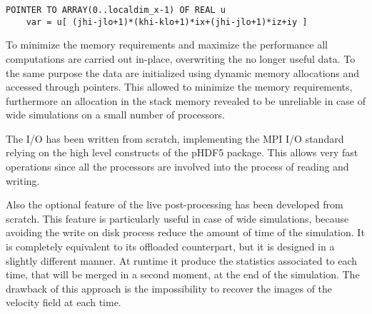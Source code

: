 \begin{lstlisting}[caption={Example of variable declaration and access to a particular value of the array. The 3D pencil is flattened to a 1D vector with $y$ as fast-varying index, $z$ as mid-varying index and $x$ as slow-varying index. This is mandatory to work with MPI},captionpos=b]
	POINTER TO ARRAY(0..localdim_x-1) OF REAL u
	var = u[ (jhi-jlo+1)*(khi-klo+1)*ix+(jhi-jlo+1)*iz+iy ]
\end{lstlisting}

To minimize the memory requirements and maximize the performance all computations are carried out in-place, overwriting the no longer useful data.
To the same purpose the data are initialized using dynamic memory allocations and accessed through pointers. This allowed to minimize the memory requirements, furthermore an allocation in the stack memory revealed to be unreliable in case of wide simulations on a small number of processors.\par

\par
The I/O has been written from scratch, implementing the MPI I/O standard relying on the high level constructs of the pHDF5 package. This allows very fast operations since all the processors are involved into the process of reading and writing.\par
Also the optional feature of the live post-processing has been developed from scratch. This feature is particularly useful in case of wide simulations, because avoiding the write on disk process reduce the amount of time of the simulation. It is completely equivalent to its offloaded counterpart, but it is designed in a slightly different manner. At runtime it produce the statistics associated to each time, that will be merged in a second moment, at the end of the simulation. The drawback of this approach is the impossibility to recover the images of the velocity field at each time.